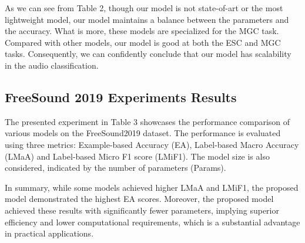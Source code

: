 \documentclass[runningheads]{llncs}
\begin{document}
As we can see from Table 2, though our model is not state-of-art or the most lightweight model, our model maintains a balance between the parameters and the accuracy. What is more, these models are specialized for the MGC task. Compared with other models, our model is good at both the ESC and MGC tasks. Consequently, we can confidently conclude that our model has scalability in the audio classification.  

\subsection{FreeSound 2019 Experiments Results}
The presented experiment in Table 3 showcases the performance comparison of various models on the FreeSound2019 dataset. The performance is evaluated using three metrics: Example-based Accuracy (EA), Label-based Macro Accuracy (LMaA) and Label-based Micro F1 score (LMiF1). The model size is also considered, indicated by the number of parameters (Params).

In summary, while some models achieved higher LMaA and LMiF1, the proposed model demonstrated the highest EA scores. Moreover, the proposed model achieved these results with significantly fewer parameters, implying superior efficiency and lower computational requirements, which is a substantial advantage in practical applications.
\end{document}
